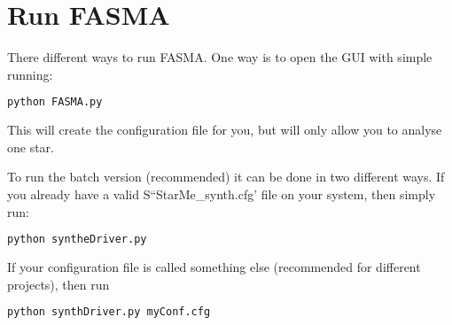 \documentclass[a4paper,10pt]{article}
\begin{document}
\section{Run FASMA}

There different ways to run FASMA. One way is to open the GUI with simple running:
\begin{lstlisting}[language=Python]
python FASMA.py
\end{lstlisting}
This will create the configuration file for you, but will only allow you to analyse one star.

To run the batch version (recommended) it can be done in two different ways. If you already have a
valid S``StarMe\_synth.cfg' file on your system, then simply run:
\begin{lstlisting}[language=Python]
python syntheDriver.py
\end{lstlisting}

If your configuration file is called something else (recommended for different projects), then run
\begin{lstlisting}[language=Python]
python synthDriver.py myConf.cfg
\end{lstlisting}
\end{document}

